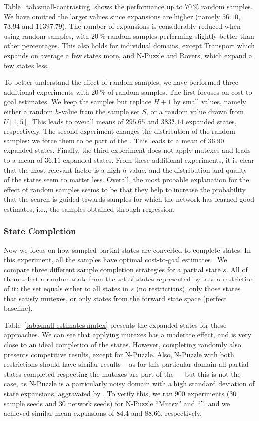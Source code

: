 

Table~\ref{tab:small-contrasting} shows the performance up to $70\,\%$ random samples. We have omitted the larger values since expansions are higher (namely $56.10$, $73.94$ and $11397.79$). The number of expansions is considerably reduced when using random samples, with $20\,\%$ random samples performing slightly better than other percentages. This also holds for individual domains, except Transport which expands on average a few states more, and N-Puzzle and Rovers, which expand a few states less.

To better understand the effect of random samples, we have performed three additional experiments with $20\,\%$ of random samples. The first focuses on cost-to-goal estimates. We keep the samples but replace $H+1$ by small values, namely either a random $h$-value from the sample set $S$, or a random value drawn from $U[1,5]$. This leads to overall means of $295.65$ and $3832.14$ expanded states, respectively. The second experiment changes the distribution of the random samples: we force them to be part of the \fssp. This leads to a mean of $36.90$ expanded states. Finally, the third experiment does not apply mutexes and leads to a mean of $36.11$ expanded states. From these additional experiments, it is clear that the most relevant factor is a high $h$-value, and the distribution and quality of the states seem to matter less. Overall, the most probable explanation for the effect of random samples seems to be that they help to increase the probability that the search is guided towards samples for which the network has learned good estimates, i.e., the samples obtained through regression.

\subsubsection{State Completion}

Now we focus on how sampled partial states are converted to complete states. In this experiment, all the samples have optimal cost-to-goal estimates \hstar. We compare three different sample completion strategies for a partial state $s$. All of them select a random state from the set of states represented by $s$ or a restriction of it: the set equals either to all states in $s$ (no restrictions), only those states that satisfy mutexes, or only states from the forward state space (perfect baseline).

Table~\ref{tab:small-estimates-mutex} presents the expanded states for these approaches. We can see that applying mutexes has a moderate effect, and is very close to an ideal completion of the states. However, completing randomly also presents competitive results, except for N-Puzzle. Also, N-Puzzle with both restrictions should have similar results -- as for this particular domain all partial states completed respecting the mutexes are part of the \fssp~-- but this is not the case, as N-Puzzle is a particularly noisy domain with a high standard deviation of state expansions, aggravated by \gbfs. To verify this, we ran $900$ experiments ($30$ sample seeds and $30$ network seeds) for N-Puzzle ``Mutex'' and ``\fssp'', and we achieved similar mean expansions of $84.4$ and $88.66$, respectively.

